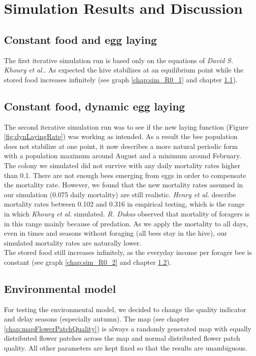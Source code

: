 \section{Simulation Results and Discussion}

\subsection{Constant food and egg laying}
	\label{chap:constantFoodConstantLaying}
	The first iterative simulation run is based only on the equations of \textit{David S. Khoury et al.}\cite{khoury13}. As expected the hive stabilizes at an equilibrium point while the stored food increases infinitely (see graph \ref{chap:sim_R0_1} and chapter \ref{chap:constantFoodConstantLaying}).

\subsection{Constant food, dynamic egg laying}
	\label{chap:constantFoodDynamicLaying}
	The second iterative simulation run was to see if the new laying function (Figure \ref{fig:dynLayingRate})  was working as intended. As a result the bee population does not stabilize at one point, it now describes a more natural periodic form with a population maximum around August and a minimum around February.\\
	
	The colony we simulated did not survive with any daily mortality rates higher than 0.1. There are not enough bees emerging from eggs in order to compensate the mortality rate. However, we found that the new mortality rates assumed in our simulation (0.075 daily mortality) are still realistic. \textit{Henry et al.} \cite{henry12} describe mortality rates between 0.102 and 0.316 in empirical testing, which is the range in which \textit{Khoury et al.} \cite{khoury13} simulated. \textit{R. Dukas} \cite{dukas08} observed that mortality of foragers is in this range mainly because of predation. As we apply the mortality to all days, even in times and seasons without foraging (all bees stay in the hive), our simulated mortality rates are naturally lower.\\
	
	The stored food still increases infinitely, as the everyday income per forager bee is constant (see graph \ref{chap:sim_R0_2} and chapter \ref{chap:constantFoodDynamicLaying}).

\subsection{Environmental model}
	\label{chap:environmentalModelDiscussion}
	For testing the environmental model, we decided to change the quality indicator and delay seasons (especially autumn). The map (see chapter \ref{chap:mapFlowerPatchQuality}) is always a randomly generated map with equally distributed flower patches across the map and normal distributed flower patch quality. All other parameters are kept fixed so that the results are unambiguous.
	
